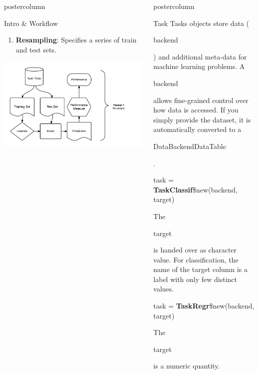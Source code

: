 \documentclass{beamer}
\newlength{\columnheight} %
\newcommand{\codeinline}[1]{\begin{codeboxinline}#1\end{codeboxinline}}
\begin{document}
\begin{frame}[fragile]{}
\begin{columns}
\begin{column}{.245\textwidth}
\begin{beamercolorbox}[center]{postercolumn}
\begin{minipage}{.98\textwidth}
{\begin{myblock}{Intro \& Workflow}
\begin{enumerate}
								\item \textbf{Resampling}: Specifies a series of train and test sets.
							\end{enumerate}
							\includegraphics[width=\textwidth]{img/ml_abstraction.png}
						\end{myblock}
					}
				\end{minipage}
			\end{beamercolorbox}
		\end{column}
		\begin{column}{.245\textwidth}
			\begin{beamercolorbox}[center]{postercolumn}
				\begin{minipage}{.98\textwidth}
					\parbox[t][\columnheight]{\textwidth}{
						\begin{myblock}{Task}
							Tasks objects store data (\codeinline{backend}) and additional meta-data for machine learning problems. A \codeinline{backend} allows fine-grained control over how data is accessed. If you simply provide the dataset, it is automatically converted to a \codeinline{DataBackendDataTable}.
							\\
							\begin{codebox}
								task = \textbf{TaskClassif}\$new(backend, target)
							\end{codebox}
							The \codeinline{target} is handed over as character value. For classification, the name of the target column is a label with only few distinct values.
							\\
							\begin{codebox}
								task = \textbf{TaskRegr}\$new(backend, target)
							\end{codebox}
							The \codeinline{target} is a numeric quantity.
							\\

\end{myblock}}
\end{minipage}
\end{beamercolorbox}
\end{column}
\end{columns}
\end{frame}
\end{document}
